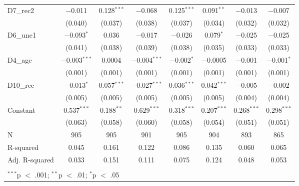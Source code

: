 \documentclass[
]{article}
\begin{document}
\begin{table}[!htbp]
\begin{tabular}{@{\extracolsep{5pt}}lccccccc}
  D7\_rec2 & $-$0.011 & 0.128$^{***}$ & $-$0.068 & 0.125$^{***}$ & 0.091$^{**}$ & $-$0.013 & $-$0.007 \\ 
  & (0.040) & (0.037) & (0.038) & (0.037) & (0.034) & (0.032) & (0.032) \\ 
  D6\_une1 & $-$0.093$^{*}$ & 0.036 & $-$0.017 & $-$0.026 & 0.079$^{*}$ & $-$0.025 & $-$0.025 \\ 
  & (0.041) & (0.038) & (0.039) & (0.038) & (0.035) & (0.033) & (0.033) \\ 
  D4\_age & $-$0.003$^{***}$ & 0.0004 & $-$0.004$^{***}$ & $-$0.002$^{*}$ & $-$0.0005 & $-$0.001 & $-$0.001$^{*}$ \\ 
  & (0.001) & (0.001) & (0.001) & (0.001) & (0.001) & (0.001) & (0.001) \\ 
  D10\_rec & $-$0.013$^{*}$ & 0.057$^{***}$ & $-$0.027$^{***}$ & 0.036$^{***}$ & 0.042$^{***}$ & $-$0.005 & $-$0.002 \\ 
  & (0.005) & (0.005) & (0.005) & (0.005) & (0.005) & (0.004) & (0.004) \\ 
  Constant & 0.537$^{***}$ & 0.188$^{**}$ & 0.629$^{***}$ & 0.318$^{***}$ & 0.207$^{***}$ & 0.268$^{***}$ & 0.298$^{***}$ \\ 
  & (0.063) & (0.058) & (0.060) & (0.058) & (0.054) & (0.051) & (0.051) \\ 
 N & 905 & 905 & 901 & 905 & 904 & 893 & 865 \\ 
R-squared & 0.045 & 0.161 & 0.122 & 0.086 & 0.135 & 0.060 & 0.065 \\ 
Adj. R-squared & 0.033 & 0.151 & 0.111 & 0.075 & 0.124 & 0.048 & 0.053 \\ 
\hline \\[-1.8ex] 
\multicolumn{8}{l}{$^{***}$p $<$ .001; $^{**}$p $<$ .01; $^{*}$p $<$ .05} \\ 
\end{tabular} 
\end{table}
\end{document}
